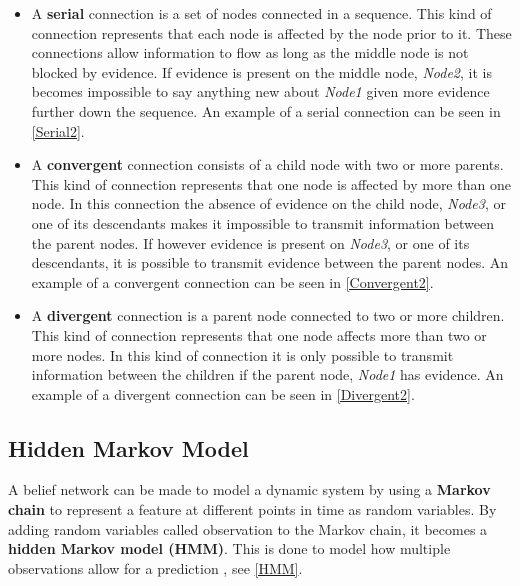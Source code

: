 \begin{itemize}
  \item A \textbf{serial} connection is a set of nodes connected in a sequence.
  This kind of connection represents that each node is affected by the node
  prior to it. These connections allow information to flow as long as the middle
  node is not blocked by evidence. If evidence is present on the middle node,
  \textit{Node2}, it is becomes impossible to say anything new about
  \textit{Node1} given more evidence further down the sequence. An example of a
  serial connection can be seen in \autoref{Serial2}.
  \item A \textbf{convergent} connection consists of a child node with two or
  more parents. This kind of connection represents that one node is affected by
  more than one node. In this connection the absence of evidence on the child
  node, \textit{Node3}, or one of its descendants makes it impossible to
  transmit information between the parent nodes. If however evidence is present
  on \textit{Node3}, or one of its descendants, it is possible to transmit
  evidence between the parent nodes. An example of a convergent connection can
  be seen in \autoref{Convergent2}.
  \item A \textbf{divergent} connection is a parent node connected to two or
  more children. This kind of connection represents that one node affects more
  than two or more nodes. In this kind of connection it is only possible to
  transmit information between the children if the parent node, \textit{Node1}
  has evidence. An example of a divergent connection can be seen in
  \autoref{Divergent2}.
\end{itemize}



\subsection{Hidden Markov Model}

A belief network can be made to model a dynamic system by using a \textbf{Markov
chain} to represent a feature at different points in time as random
variables. By adding random variables called observation to the
Markov chain, it becomes a \textbf{hidden Markov model (HMM)}. This is done to
model how multiple observations allow for a prediction
\citep[ch.6.5.2]{MIBook}, see \autoref{HMM}.


